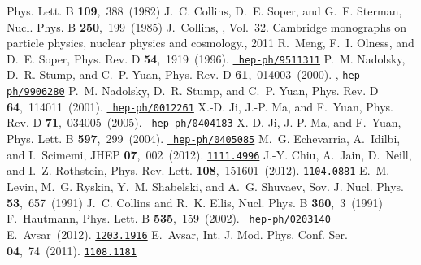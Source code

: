 \documentclass[11pt]{article} \usepackage{mystyle-new}
\begin{document}
\begin{mcbibliography}{10}
\newblock Phys. Lett. B{} {\bf 109},~388~(1982)\relax
\relax
{}
J.~C. Collins, D.~E. Soper, and G.~F. Sterman,
\newblock Nucl. Phys. B{} {\bf 250},~199~(1985)\relax
\relax
{}
J.~Collins,
, Vol.~32.
\newblock Cambridge monographs on particle physics, nuclear physics and
  cosmology., 2011\relax
\relax
{}
R.~Meng, F.~I. Olness, and D.~E. Soper,
\newblock Phys. Rev. D{} {\bf 54},~1919~(1996).
\newblock \href{http://www.arXiv.org/abs/hep-ph/9511311}{{\tt
  hep-ph/9511311}}\relax
\relax
{}
P.~M. Nadolsky, D.~R. Stump, and C.~P. Yuan,
\newblock Phys. Rev. D{} {\bf 61},~014003~(2000).
,
  \href{http://www.arXiv.org/abs/hep-ph/9906280}{{\tt hep-ph/9906280}}\relax
\relax
{}
P.~M. Nadolsky, D.~R. Stump, and C.~P. Yuan,
\newblock Phys. Rev. D{} {\bf 64},~114011~(2001).
\newblock \href{http://www.arXiv.org/abs/hep-ph/0012261}{{\tt
  hep-ph/0012261}}\relax
\relax
{}
X.-D. Ji, J.-P. Ma, and F.~Yuan,
\newblock Phys. Rev. D{} {\bf 71},~034005~(2005).
\newblock \href{http://www.arXiv.org/abs/hep-ph/0404183}{{\tt
  hep-ph/0404183}}\relax
\relax
{}
X.-D. Ji, J.-P. Ma, and F.~Yuan,
\newblock Phys. Lett. B{} {\bf 597},~299~(2004).
\newblock \href{http://www.arXiv.org/abs/hep-ph/0405085}{{\tt
  hep-ph/0405085}}\relax
\relax
{}
M.~G. Echevarria, A.~Idilbi, and I.~Scimemi,
\newblock JHEP{} {\bf 07},~002~(2012).
\newblock \href{http://www.arXiv.org/abs/1111.4996}{{\tt 1111.4996}}\relax
\relax
{}
J.-Y. Chiu, A.~Jain, D.~Neill, and I.~Z. Rothstein,
\newblock Phys. Rev. Lett.{} {\bf 108},~151601~(2012).
\newblock \href{http://www.arXiv.org/abs/1104.0881}{{\tt 1104.0881}}\relax
\relax
{}
E.~M. Levin, M.~G. Ryskin, Y.~M. Shabelski, and A.~G. Shuvaev,
\newblock Sov. J. Nucl. Phys.{} {\bf 53},~657~(1991)\relax
\relax
{}
J.~C. Collins and R.~K. Ellis,
\newblock Nucl. Phys. B{} {\bf 360},~3~(1991)\relax
\relax
{}
F.~Hautmann,
\newblock Phys. Lett. B{} {\bf 535},~159~(2002).
\newblock \href{http://www.arXiv.org/abs/hep-ph/0203140}{{\tt
  hep-ph/0203140}}\relax
\relax
{}
E.~Avsar~(2012).
\newblock \href{http://www.arXiv.org/abs/1203.1916}{{\tt 1203.1916}}\relax
\relax
{}
E.~Avsar,
\newblock Int. J. Mod. Phys. Conf. Ser.{} {\bf 04},~74~(2011).
\newblock \href{http://www.arXiv.org/abs/1108.1181}{{\tt 1108.1181}}\relax

\end{mcbibliography}
\end{document}
